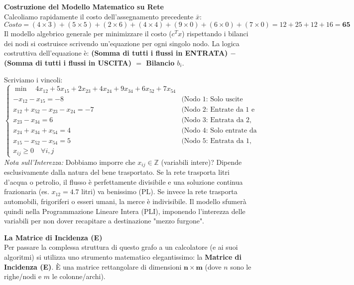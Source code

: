 \documentclass[12pt, a4paper]{article}
\newcommand{\separatore}{\noindent{\color{titlecolor!50}\rule{\textwidth}{0.6pt}}}
\begin{document}
	\vspace{0.6cm}
	\separatore
	\vspace{0.4cm}
	
	\textbf{Costruzione del Modello Matematico su Rete}\\
	Calcoliamo rapidamente il costo dell'assegnamento precedente $\bar{x}$:
	\[ Costo = (4 \times 3) + (5 \times 5) + (2 \times 6) + (4 \times 4) + (9 \times 0) + (6 \times 0) + (7 \times 0) = 12 + 25 + 12 + 16 = \mathbf{65} \]
	Il modello algebrico generale per minimizzare il costo ($c^T x$) rispettando i bilanci dei nodi si costruisce scrivendo un'equazione per ogni singolo nodo. La logica costruttiva dell'equazione è: \textbf{(Somma di tutti i flussi in ENTRATA) $-$ (Somma di tutti i flussi in USCITA) $=$ Bilancio $b_i$}.
	
	Scriviamo i vincoli:
	\[
	\begin{cases}
		\min \quad 4x_{12} + 5x_{15} + 2x_{23} + 4x_{24} + 9x_{34} + 6x_{52} + 7x_{54} \\[6pt]
		-x_{12} - x_{15} = -8 \quad &\text{(Nodo 1: Solo uscite verso 2 e 5)} \\
		x_{12} + x_{52} - x_{23} - x_{24} = -7 \quad &\text{(Nodo 2: Entrate da 1 e 5, Uscite verso 3 e 4)} \\
		x_{23} - x_{34} = 6 \quad &\text{(Nodo 3: Entrata da 2, Uscita verso 4)} \\
		x_{24} + x_{34} + x_{54} = 4 \quad &\text{(Nodo 4: Solo entrate da 2, 3 e 5)} \\
		x_{15} - x_{52} - x_{54} = 5 \quad &\text{(Nodo 5: Entrata da 1, Uscite verso 2 e 4)} \\[6pt]
		x_{ij} \geq 0 \quad \forall i,j
	\end{cases}
	\]
	\textit{Nota sull'Interezza:} Dobbiamo imporre che $x_{ij} \in \mathbb{Z}$ (variabili intere)? Dipende esclusivamente dalla natura del bene trasportato. Se la rete trasporta litri d'acqua o petrolio, il flusso è perfettamente divisibile e una soluzione continua frazionaria (es. $x_{12} = 4.7$ litri) va benissimo (PL). Se invece la rete trasporta automobili, frigoriferi o esseri umani, la merce è indivisibile. Il modello sfumerà quindi nella Programmazione Lineare Intera (PLI), imponendo l'interezza delle variabili per non dover recapitare a destinazione "mezzo furgone".
	
	\vspace{0.6cm}
	\textbf{La Matrice di Incidenza (E)}\\
	Per passare la complessa struttura di questo grafo a un calcolatore (e ai suoi algoritmi) si utilizza uno strumento matematico elegantissimo: la \textbf{Matrice di Incidenza (E)}.
	È una matrice rettangolare di dimensioni $\mathbf{n \times m}$ (dove $n$ sono le righe/nodi e $m$ le colonne/archi). 
	
\end{document}
